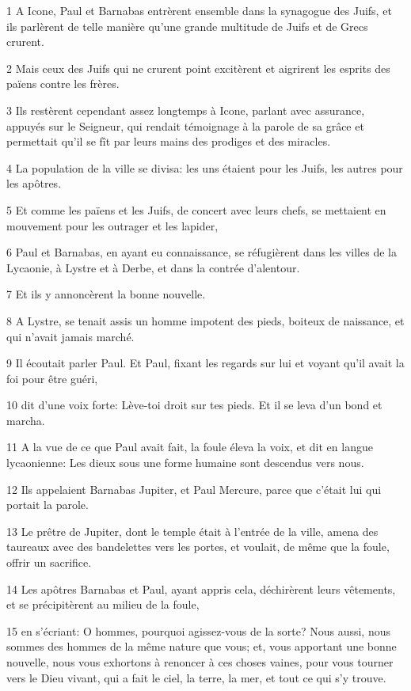 \par 1 A Icone, Paul et Barnabas entrèrent ensemble dans la synagogue des Juifs, et ils parlèrent de telle manière qu'une grande multitude de Juifs et de Grecs crurent.
\par 2 Mais ceux des Juifs qui ne crurent point excitèrent et aigrirent les esprits des païens contre les frères.
\par 3 Ils restèrent cependant assez longtemps à Icone, parlant avec assurance, appuyés sur le Seigneur, qui rendait témoignage à la parole de sa grâce et permettait qu'il se fît par leurs mains des prodiges et des miracles.
\par 4 La population de la ville se divisa: les uns étaient pour les Juifs, les autres pour les apôtres.
\par 5 Et comme les païens et les Juifs, de concert avec leurs chefs, se mettaient en mouvement pour les outrager et les lapider,
\par 6 Paul et Barnabas, en ayant eu connaissance, se réfugièrent dans les villes de la Lycaonie, à Lystre et à Derbe, et dans la contrée d'alentour.
\par 7 Et ils y annoncèrent la bonne nouvelle.
\par 8 A Lystre, se tenait assis un homme impotent des pieds, boiteux de naissance, et qui n'avait jamais marché.
\par 9 Il écoutait parler Paul. Et Paul, fixant les regards sur lui et voyant qu'il avait la foi pour être guéri,
\par 10 dit d'une voix forte: Lève-toi droit sur tes pieds. Et il se leva d'un bond et marcha.
\par 11 A la vue de ce que Paul avait fait, la foule éleva la voix, et dit en langue lycaonienne: Les dieux sous une forme humaine sont descendus vers nous.
\par 12 Ils appelaient Barnabas Jupiter, et Paul Mercure, parce que c'était lui qui portait la parole.
\par 13 Le prêtre de Jupiter, dont le temple était à l'entrée de la ville, amena des taureaux avec des bandelettes vers les portes, et voulait, de même que la foule, offrir un sacrifice.
\par 14 Les apôtres Barnabas et Paul, ayant appris cela, déchirèrent leurs vêtements, et se précipitèrent au milieu de la foule,
\par 15 en s'écriant: O hommes, pourquoi agissez-vous de la sorte? Nous aussi, nous sommes des hommes de la même nature que vous; et, vous apportant une bonne nouvelle, nous vous exhortons à renoncer à ces choses vaines, pour vous tourner vers le Dieu vivant, qui a fait le ciel, la terre, la mer, et tout ce qui s'y trouve.
